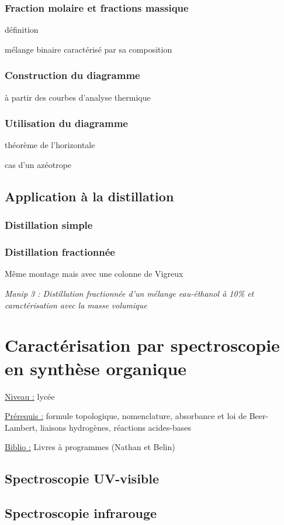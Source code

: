 \documentclass{article}%
\begin{document}
\subsubsection{Fraction molaire et fractions massique}
définition

mélange binaire caractérisé par sa composition

\subsubsection{Construction du diagramme}
à partir des courbes d'analyse thermique
\subsubsection{Utilisation du diagramme}
théorème de l'horizontale

cas d'un azéotrope

\subsection{Application à la distillation}
\subsubsection{Distillation simple}
\subsubsection{Distillation fractionnée}
Même montage mais avec une colonne de Vigreux

\textit{Manip 3 : Distillation fractionnée d'un mélange eau-éthanol à 10\% et caractérisation avec la masse volumique}
\section{Caractérisation par spectroscopie en synthèse organique}

\underline{Niveau :} lycée

\underline{Prérequis :} formule topologique, nomenclature, absorbance et loi de Beer-Lambert, liaisons hydrogènes, réactions acides-bases

\underline{Biblio :} Livres à programmes (Nathan et Belin) 
\subsection{Spectroscopie UV-visible}
\subsection{Spectroscopie infrarouge}
\end{document}
